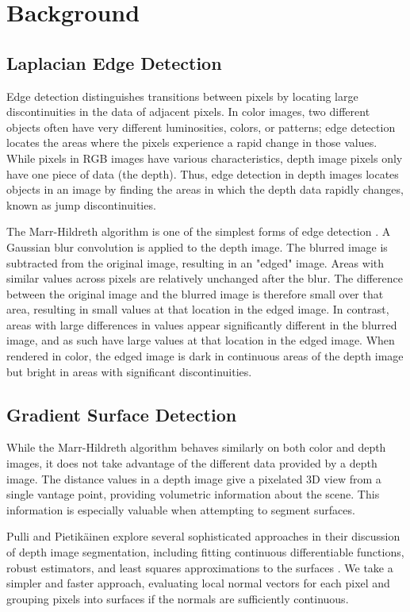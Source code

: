 
\section{Background}
\label{sec:background}

\subsection{Laplacian Edge Detection}
\label{subsec:laplacian}
Edge detection distinguishes transitions between pixels by locating large discontinuities in the data of adjacent pixels. In color images, two different
objects often have very different luminosities, colors, or
patterns; edge detection locates the areas where the pixels
experience a rapid change in those values. While pixels in RGB images
have various characteristics, depth image pixels only have one
piece of data (the depth). Thus, edge detection in depth images
locates objects in an image by finding the areas in which the depth
data rapidly changes, known as jump discontinuities. 

The Marr-Hildreth algorithm is one of the simplest forms of edge detection \cite{marr}. A Gaussian blur convolution is applied to the depth image. The blurred image is subtracted from the original image, resulting
in an "edged" image. Areas with similar values across pixels are
relatively unchanged after the blur.   The difference between the original image and the blurred image is therefore small over that area, resulting in small values at that location in the edged image. In contrast, areas with large
differences in values appear significantly different in the blurred image, and as such have large values at that location in the edged image. When rendered in color, the edged image is dark in continuous areas of the depth image but bright in areas with significant discontinuities. 

\subsection{Gradient Surface Detection}
\label{subsec:gradient}
While the Marr-Hildreth algorithm behaves similarly on both color and depth images, it does not take advantage of the different data provided by a depth image.  The distance values in a depth image give a pixelated 3D view from a single vantage point, providing volumetric information about the scene.  This information is especially valuable when attempting to segment surfaces.

Pulli and Pietik{\"a}inen explore several sophisticated approaches in their discussion of depth image segmentation, including fitting continuous differentiable functions, robust estimators, and least squares approximations to the surfaces \cite{pulli}.  We take a simpler and faster approach, evaluating local normal vectors for each pixel and grouping pixels into surfaces if the normals are sufficiently continuous.  


